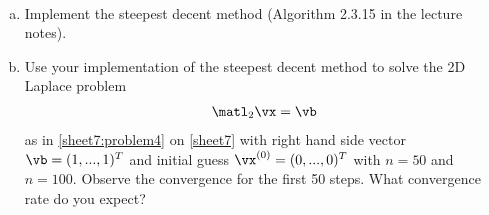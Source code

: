 \begin{Sheet}
  \begin{Problem}[Programming]
    \label{sheet8:problem4}
    \hfill\\\vspace{-6ex}
    \begin{enumerate}[(a)]
    \item Implement the steepest decent method (Algorithm 2.3.15 in the
      lecture notes).
    \item Use your implementation of the steepest decent method to
      solve the 2D Laplace problem
      \begin{gather*}
        \matl_2\vx=\vb
      \end{gather*}
      as in \cref{sheet7:problem4} on \cref{sheet7} with right hand
      side vector $\vb=(1,...,1)^T$ and initial guess
      $\vx^{(0)}=(0,...,0)^T$ with $n=50$ and $n=100$. Observe the
      convergence for the first 50 steps. What convergence rate do you
      expect?
    \end{enumerate}
  \end{Problem}

  \vfill
  
  

\end{Sheet}


